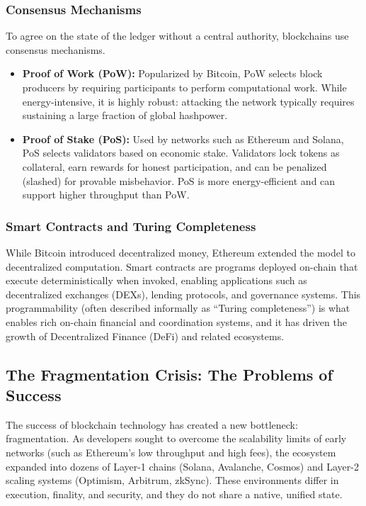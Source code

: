 \documentclass[11pt,a4paper]{article}
\begin{document}
\subsubsection{Consensus Mechanisms}
To agree on the state of the ledger without a central authority, blockchains use consensus mechanisms.
\begin{itemize}
    \item \textbf{Proof of Work (PoW):} Popularized by Bitcoin, PoW selects block producers by requiring participants to perform computational work. While energy-intensive, it is highly robust: attacking the network typically requires sustaining a large fraction of global hashpower.
    \item \textbf{Proof of Stake (PoS):} Used by networks such as Ethereum and Solana, PoS selects validators based on economic stake. Validators lock tokens as collateral, earn rewards for honest participation, and can be penalized (slashed) for provable misbehavior. PoS is more energy-efficient and can support higher throughput than PoW.
\end{itemize}

\subsubsection{Smart Contracts and Turing Completeness}
While Bitcoin introduced decentralized money, Ethereum extended the model to decentralized computation. Smart contracts are programs deployed on-chain that execute deterministically when invoked, enabling applications such as decentralized exchanges (DEXs), lending protocols, and governance systems. This programmability (often described informally as ``Turing completeness'') is what enables rich on-chain financial and coordination systems, and it has driven the growth of Decentralized Finance (DeFi) and related ecosystems.

\subsection{The Fragmentation Crisis: The Problems of Success}
The success of blockchain technology has created a new bottleneck: fragmentation. As developers sought to overcome the scalability limits of early networks (such as Ethereum's low throughput and high fees), the ecosystem expanded into dozens of Layer-1 chains (Solana, Avalanche, Cosmos) and Layer-2 scaling systems (Optimism, Arbitrum, zkSync). These environments differ in execution, finality, and security, and they do not share a native, unified state.
\end{document}

